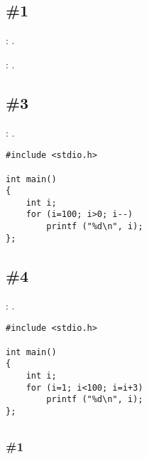 \subsection{\Exercise \#1}
\label{exercise_solutions_switch_1}

\Exercise: .

: \printf {}.

\subsection{}

\subsection{\Exercise \#3}
\label{exercise_solutions_loops_3}

\Exercise: .

\begin{lstlisting}
#include <stdio.h>

int main()
{
	int i;
	for (i=100; i>0; i--)
		printf ("%d\n", i);
};
\end{lstlisting}

\subsection{\Exercise \#4}
\label{exercise_solutions_loops_4}

\Exercise: .

\begin{lstlisting}
#include <stdio.h>

int main()
{
	int i;
	for (i=1; i<100; i=i+3)
		printf ("%d\n", i);
};
\end{lstlisting}

\subsection{}

\subsubsection{\Exercise \#1}
\label{exercise_solutions_strlen_1}

